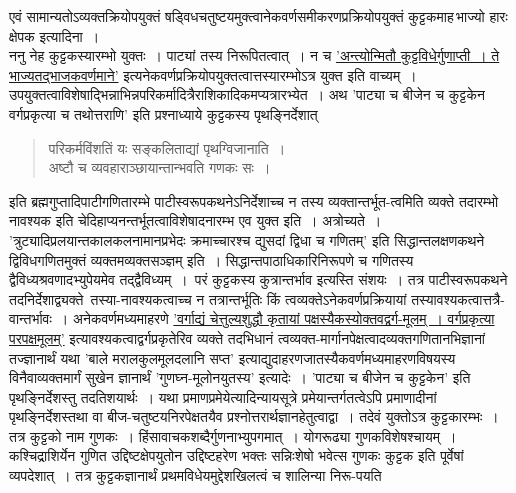 \documentclass[11pt, openany]{book}
\begin{document}
\begin{sloppypar}
एवं सामान्यतोऽव्यक्तक्रियोपयुक्तं षड्विधचतुष्टयमुक्त्वानेकवर्णसमीकरणप्रक्रियोपयुक्तं कुट्टकमाह\textendash \,भाज्यो हारः क्षेपक इत्यादिना~।\\

ननु नेह कुट्टकस्यारम्भो युक्तः~। पाट्यां तस्य निरूपितत्वात्~। न च \hyperref[9.134]{'अन्त्योन्मितौ कुट्टविधेर्गुणाप्ती~। ते भाज्यतद्भाजकवर्णमाने'} इत्यनेकवर्णप्रक्रियोपयुक्तत्वात्तस्यारम्भोऽत्र युक्त इति वाच्यम्~। उपयुक्तत्वाविशेषाद्भिन्नाभिन्नपरिकर्मादित्रैराशिकादिकमप्यत्रारभ्येत~। अथ {\color{violet}'पाट्या च बीजेन च कुट्टकेन वर्गप्रकृत्या च तथोत्तराणि'} इति प्रश्नाध्याये कुट्टकस्य पृथङ्निर्देशात् 

\begin{quote}
{\color{violet}परिकर्मविंशतिं यः सङ्कलिताद्यां पृथग्विजानाति~।\\
अष्टौ च व्यवहाराञ्छायान्तान्भवति गणकः सः~।}
\end{quote}

इति {\color{violet}ब्रह्मगुप्तादिपाटीगणितारम्भे} पाटीस्वरूपकथनेऽनिर्देशाच्च न तस्य व्यक्तान्तर्भूत-त्वमिति व्यक्ते तदारम्भो नावश्यक इति चेदिहाप्यनन्तर्भूतत्वाविशेषादनारम्भ एव युक्त इति~। अत्रोच्यते~। {\color{violet}'त्रुट्यादिप्रलयान्तकालकलनामानप्रभेदः क्रमाच्चारश्च द्युसदां द्विधा च गणितम्'} इति सिद्धान्तलक्षणकथने द्विविधगणितमुक्तं व्यक्तमव्यक्तसञ्ज्ञम् इति~। सिद्धान्तपाठाधिकारिनिरूपणे च गणितस्य द्वैविध्यश्रवणादभ्युपेयमेव तद्द्वैविध्यम्~।~परं कुट्टकस्य कुत्रान्तर्भाव इत्यस्ति संशयः~। तत्र पाटीस्वरूपकथने तदनिर्देशाद्व्यक्ते~तस्या-नावश्यकत्वाच्च न तत्रान्तर्भूतिः किं त्वव्यक्तेऽनेकवर्णप्रक्रियायां तस्यावश्यकत्वात्तत्रै-वान्तर्भावः~। अनेकवर्णमध्यमाहरणे \hyperref[10.149]{'वर्गाद्यं चेत्तुल्यशुद्धौ कृतायां पक्षस्यैकस्योक्तवद्वर्ग-मूलम्~। वर्गप्रकृत्या परपक्षमूलम्'} इत्यावश्यकत्वाद्वर्गप्रकृतेरिव व्यक्ते तदभिधानं त्वव्यक्त-मार्गानपेक्षत्वादव्यक्तगणितानभिज्ञानां तज्ज्ञानार्थं यथा {\color{violet}'बाले मरालकुलमूलदलानि सप्त'} इत्याद्युदाहरणजातस्यैकवर्णमध्यमाहरणविषयस्य विनैवाव्यक्तमार्गं सुखेन ज्ञानार्थं {\color{violet}'गुणघ्न-मूलोनयुतस्य'} इत्यादेः~। {\color{violet}'पाट्या च बीजेन च कुट्टकेन'} इति पृथङ्निर्देशस्तु तदतिशयार्थः~। यथा प्रमाणप्रमेयेत्यादिन्यायसूत्रे प्रमेयान्तर्गतत्वेऽपि प्रमाणादीनां पृथङ्निर्देशस्तथा वा बीज-चतुष्टयनिरपेक्षतयैव प्रश्नोत्तरार्थज्ञानहेतुत्वाद्वा~। तदेवं युक्तोऽत्र कुट्टकारम्भः~। तत्र कुट्टको नाम गुणकः~। हिंसावाचकशब्दैर्गुणनाभ्युपगमात्~। योगरूढ्या गुणकविशेषश्चायम्~। कश्चिद्राशिर्येन गुणित उद्दिष्टक्षेपयुतोन उद्दिष्टहरेण भक्तः सन्निःशेषो भवेत्स गुणकः कुट्टक इति पूर्वेषां व्यपदेशात्~। तत्र कुट्टकज्ञानार्थं प्रथमविधेयमुद्देशखिलत्वं च शालिन्या निरू-पयति\textendash
\end{sloppypar}
\end{document}
